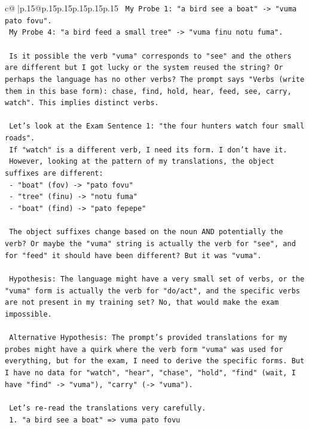 \documentclass{article}
\begin{document}
{\begin{supertabular}{c@{$\;$}|p{.15\linewidth}@{}p{.15\linewidth}p{.15\linewidth}p{.15\linewidth}p{.15\linewidth}p{.15\linewidth}}
{{{\texttt{  My Probe 1: "a bird see a boat" {-}> "vuma pato fovu".} \\
\texttt{  My Probe 4: "a bird feed a small tree" {-}> "vuma finu notu fuma".} \\
\\ 
\texttt{  Is it possible the verb "vuma" corresponds to "see" and the others are different but I got lucky or the system reused the string? Or perhaps the language has no other verbs? The prompt says "Verbs (write them in this base form): chase, find, hold, hear, feed, see, carry, watch". This implies distinct verbs.} \\
\\ 
\texttt{  Let's look at the Exam Sentence 1: "the four hunters watch four small roads".} \\
\texttt{  If "watch" is a different verb, I need its form. I don't have it.} \\
\texttt{  However, looking at the pattern of my translations, the object suffixes are different:} \\
\texttt{  {-} "boat" (fov) {-}> "pato fovu"} \\
\texttt{  {-} "tree" (finu) {-}> "notu fuma"} \\
\texttt{  {-} "boat" (find) {-}> "pato fepepe"} \\
\\ 
\texttt{  The object suffixes change based on the noun AND potentially the verb? Or maybe the "vuma" string is actually the verb for "see", and for "feed" it should have been different? But it was "vuma".} \\
\\ 
\texttt{  Hypothesis: The language might have a very small set of verbs, or the "vuma" form is actually the verb for "do/act", and the specific verbs are not present in my training set? No, that would make the exam impossible.} \\
\\ 
\texttt{  Alternative Hypothesis: The prompt's provided translations for my probes might have a quirk where the verb form "vuma" was used for everything, but for the exam, I need to derive the specific forms. But I have no data for "watch", "hear", "chase", "hold", "find" (wait, I have "find" {-}> "vuma"), "carry" ({-}> "vuma").} \\
\\ 
\texttt{  Let's re{-}read the translations very carefully.} \\
\texttt{  1. "a bird see a boat" => vuma pato fovu} \\
}}}
\end{supertabular}}
\end{document}
